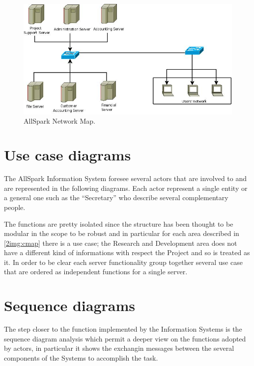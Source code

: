 \begin{figure}
\begin{centering}
\includegraphics[scale=0.45]{assign3/dia/NetMap.jpeg}
\caption{AllSpark Network Map.}
\label{2img:NetMap}
\end{centering}
\end{figure}


\section{Use case diagrams}
The AllSpark Information System foresee several actors that are involved to and are represented in the following diagrams. Each actor represent a single entity or a general one such as the ``Secretary'' who describe several complementary people.

The functions are pretty isolated since the structure has been thought to be modular in the scope to be robust and in particular for each area described in \ref{2img:cmap} there is a use case; the Research and Development area does not have a different kind of informations with respect the Project and so is treated as it. In order to be clear each server functionality group together several use case that are ordered as independent functions for a single server.
 




\section{Sequence diagrams}
The step closer to the function implemented by the Information Systems is the sequence diagram analysis which permit a deeper view on the functions adopted by actors, in particular it shows the exchangin messages between the several components of the Systems to accomplish the task.

